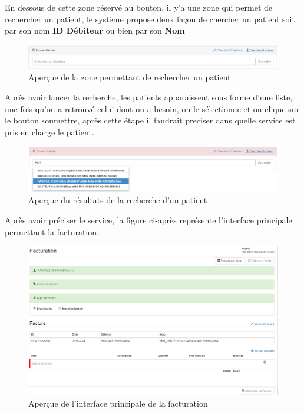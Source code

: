 \documentclass[12pt,a4paper]{report}
\begin{document}
En dessous de cette zone réservé au bouton, il y'a une zone qui permet de rechercher un patient, le système propose deux façon de chercher un patient soit par son nom\textbf{ ID Débiteur} ou bien par son \textbf{Nom} 

\begin{figure}[h]
\begin{center}
\includegraphics[width=14cm]{pic/foundPatient.png}
\end{center}
\caption{Aperçue de la zone permettant de rechercher un patient}
\label{Aperçue de la zone permettant de rechercher un patient}
\end{figure}

Après avoir lancer la recherche, les patients apparaissent sous forme d'une liste, une fois qu'on a retrouvé celui dont on a besoin, on le sélectionne et on clique sur le bouton soumettre, après cette étape il faudrait preciser dans quelle service est pris en charge le patient.

\begin{figure}[h]
\begin{center}
\includegraphics[width=14cm]{pic/PatientTrouver.png}
\end{center}
\caption{Aperçue du résultats de la recherche d'un patient}
\label{Aperçue du résultats de la recherche d'un patient}
\end{figure}

\newpage
Après avoir préciser le service, la figure ci-après représente l'interface principale permettant la facturation.

\begin{figure}[h]
\begin{center}
\includegraphics[width=14cm]{pic/FacturationInterface.png}
\end{center}
\caption{Aperçue de l'interface principale de la facturation}
\label{Aperçue de l'interface principale de la facturation}
\end{figure}
\end{document}
